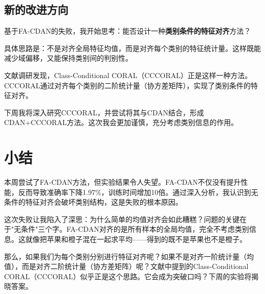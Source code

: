 \documentclass[12pt,a4paper]{ctexart}
\begin{document}
\subsection{新的改进方向}

基于FA-CDAN的失败，我开始思考：能否设计一种\textbf{类别条件的特征对齐}方法？

具体思路是：不是对齐全局特征均值，而是对齐每个类别的特征统计量。这样既能减少域偏移，又能保持类别间的判别性。

文献调研发现，Class-Conditional CORAL（CCCORAL）正是这样一种方法。CCCORAL通过对齐每个类别的二阶统计量（协方差矩阵），实现了类别条件的特征对齐。

下周我将深入研究CCCORAL，并尝试将其与CDAN结合，形成CDAN+CCCORAL方法。这次我会更加谨慎，充分考虑类别信息的作用。

\section{小结}

本周尝试了FA-CDAN方法，但实验结果令人失望。FA-CDAN不仅没有提升性能，反而导致准确率下降1.97\%，训练时间增加10倍。通过深入分析，我认识到无条件的特征对齐会破坏类别结构，这是失败的根本原因。

这次失败让我陷入了深思：为什么简单的均值对齐会如此糟糕？问题的关键在于"无条件"三个字。FA-CDAN对齐的是所有样本的全局均值，完全不考虑类别信息。这就像把苹果和橙子混在一起求平均——得到的既不是苹果也不是橙子。

那么，如果我们为每个类别分别进行特征对齐呢？如果不是对齐一阶统计量（均值），而是对齐二阶统计量（协方差矩阵）呢？文献中提到的Class-Conditional CORAL（CCCORAL）似乎正是这个思路。它会成为突破口吗？下周的实验将揭晓答案。
\end{document}
